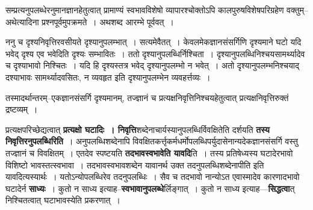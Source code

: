 \documentclass[article,12pt,a4paper]{memoir}
\begin{document}
	  \pstart सम्प्रत्यनुपलब्धेरनुमानज्ञानहेतुत्वात् प्रामाण्यं स्वभावविशेषो व्यापारश्चोक्तोऽपि कालपुरुषविशेषपरिग्रहेण वक्तुम्--अथेत्यादिना प्रश्नपूर्वमुपक्रमते । अथशब्द आरम्भे पूर्ववत् ।
	\pend
	  \bigskip
	  \begingroup
	

	  \pstart ननु च दृश्यनिवृत्तिरवसीयते दृश्यानुपलम्भात् । सत्यमेवैतत् । केवलमेकज्ञानसंसर्गिणि दृश्यमाने घटो यदि भवेद् दृश्य एव भवेदिति दृश्यः सम्भावितः । ततो दृश्यानुपलब्धिर्निश्चिता । दृश्यानुपलब्धिनिश्चयसामर्थ्यादेव च दृश्याभावो निश्चितः । यदि हि दृश्यस्तत्र भवेद् दृश्यानुपलम्भो न भवेत् । अतो दृश्यानुपलम्भनिश्चयाद् दश्याभावः सामर्थ्यादवसितः, न व्यवहृत इति दृश्यानुपलम्भेन व्यवहर्त्तव्यः ।
	\pend
        

	  \pstart तस्मादर्थान्तरम्--एकज्ञानसंसर्गि दृश्यमानम्, तज्ज्ञानं च प्रत्यक्षनिवृत्तिनिश्चयहेतुत्वात् प्रत्यक्षनिवृत्तिरुक्तं द्रष्टव्यम् ।
	\pend
      
	  \endgroup
	

	  \pstart प्रत्यक्षपरिच्छेद्यत्वात् \textbf{प्रत्यक्षो घटादिः । निवृत्ति}शब्देनाचार्यस्यानुपलब्धिर्विवक्षितेति दर्शयति \textbf{तस्य निवृत्तिरनुपलब्धिरिति} । अनुपलब्धिशब्देनापि विवक्षितकर्त्तृकर्मधर्मोपलब्धिपर्युदासेनान्यदेकज्ञानसंसर्गि वस्तु तज्ज्ञानं च विवक्षितम् । \leavevmode{}एतदेव स्पष्टयति \textbf{तदभावस्वभावेति यावदि}ति । तस्य प्रतिषेध्यस्य घटादेरभावो विशिष्टो भावस्तत्स्वभावा । तदभावस्वभावशब्देन यावानर्थ उक्त तदनुपलब्धिशब्देनापीति इति यावदित्यस्यार्थः । यतोऽन्योपलब्धिरेव तदनुपलब्धिः । सैव च तदभावो नान्योऽत एवास्मादेव कारणादभावो घटादेर्न \textbf{साध्यः} । कुतो न साध्य इत्याह--\textbf{स्वभावानुपलब्धे}र्लिङ्गात् । कुतो न साध्य इत्याह—\textbf{सिद्धत्वा}त् निश्चितत्वात् घटाभावस्येति प्रकरणात् ।
	\pend
      
\end{document}
